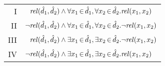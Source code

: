 \documentclass{new_tlp}
\def\mi#1{\mathit{#1\/}}
\def\be{\begin{enumerate}}
\def\ee{\end{enumerate}}
\begin{document}



\noindent\begin{tabular}{r@{}l}
 I &  $\phantom{\neg} \mi{rel}(\hat{d}_1,\hat{d}_2) \wedge \forall x_1\,{\in}\, \hat{d}_1,\forall x_2\,{\in}\, \hat{d}_2. \mi{rel}(x_1,x_2)$ \\%
 II & $\neg \mi{rel}(\hat{d}_1,\hat{d}_2) \wedge \forall x_1\,{\in}\,  \hat{d}_1,\forall x_2\,{\in}\, \hat{d}_2. \neg \mi{rel}(x_1,x_2)$ 
     \\%
 III  &  $\phantom{\neg} \mi{rel}(\hat{d}_1,\hat{d}_2) \wedge \exists x_1\,{\in}\, \hat{d}_1,\exists x_2\,{\in}\, \hat{d}_2. \neg \mi{rel}(x_1,x_2)$\\%
  IV &        $\neg \mi{rel}(\hat{d}_1,\hat{d}_2) \wedge \exists x_1\,{\in}\, \hat{d}_1,\exists x_2\,{\in}\, \hat{d}_2. \mi{rel}(x_1,x_2)$
\end{tabular}
\end{document}
